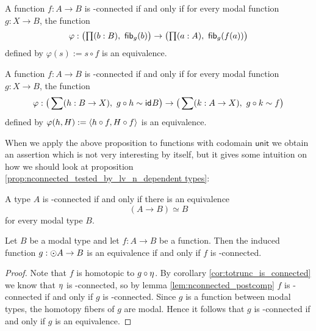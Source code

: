 \begin{cor}
A function $f:A\to B$ is \modal-connected if and only if for every modal function $g:X\to B$, the function
\begin{equation*}
\varphi:\big(\prd{b:B}\hfib{g}b\big)\to\big(\prd{a:A} \hfib{g}{f(a)}\big)
\end{equation*}
defined by $\varphi(s):=s\circ f$ is an equivalence.
\end{cor}

\begin{cor}
A function $f:A\to B$ is \modal-connected if and only if for every modal function $g:X\to B$, the function
\begin{equation*}
\varphi :\big(\sum(h:B\to X),\ g\circ h\sim \idfunc{B}\big)\to\big(\sum(k:A\to X),\ g\circ k\sim f\big)
\end{equation*}
defined by $\varphi(h,H):={\langle h\circ f,H\circ f\rangle}$ is an equivalence.
\end{cor}

When we apply the above proposition to functions with codomain $\mathsf{unit}$ we obtain an assertion which is not very
interesting by itself, but it gives some intuition on how we should look at proposition \ref{prop:nconnected_tested_by_lv_n_dependent
types}:

\begin{cor}
A type $A$ is \modal-connected if and only if there is an equivalence
\begin{equation*}
(A\to B)\simeq B
\end{equation*}
for every modal type $B$.
\end{cor}

\begin{lem}\label{lem:nconnected_to_leveln_to_equiv}
Let $B$ be a modal type and let $f:A\to B$ be a function. Then the induced function $g:\odot A\to B$ is an
equivalence if and only if $f$ is \modal-connected.
\end{lem}

\begin{proof}
Note that $f$ is homotopic to $g\circ\eta$. By corollary \ref{cor:totrunc_is_connected} we know that $\eta$ is \modal-connected, so
by
lemma \ref{lem:nconnected_postcomp} $f$ is \modal-connected if and only if $g$ is \modal-connected. Since $g$ is a function between
modal types, the homotopy fibers of $g$ are modal. Hence it follows that $g$ is \modal-connected if and only if $g$ is an equivalence.
\end{proof}

